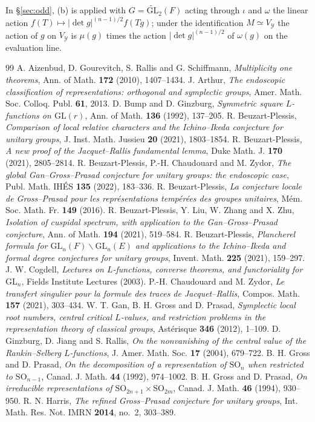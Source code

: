 \documentclass[11pt,oneside,notitlepage]{book}
\numberwithin{equation}{section}
\theoremstyle{plain}
\theoremstyle{definition}
\newcommand{\GL}{\mathrm{GL}}
\newcommand{\SO}{\mathrm{SO}}
\newcommand{\tGL}{\widetilde{\GL}}
\begin{document}
In \S\ref{sec:odd}, (b) is applied with $G=\tGL_2(F)$ acting through $\iota$ and $\omega$ the linear action $f(T)\mapsto|\det g|^{(n-1)/2}f(Tg)$; under the identification $M\simeq V_{\mathcal Y}$ the action of $g$ on $V_{\mathcal Y}$ is $\mu(g)$ times the action $|\det g|^{(n-1)/2}$ of $\omega(g)$ on the evaluation line.


\backmatter
\begin{thebibliography}{99}
	 A. Aizenbud, D. Gourevitch, S. Rallis and G. Schiffmann, \emph{Multiplicity one theorems}, Ann. of Math. \textbf{172} (2010), 1407--1434.
	 J. Arthur, \emph{The endoscopic classification of representations: orthogonal and symplectic groups}, Amer. Math. Soc. Colloq. Publ. \textbf{61}, 2013.
	 D. Bump and D. Ginzburg, \emph{Symmetric square $L$-functions on $\GL(r)$}, Ann. of Math. \textbf{136} (1992), 137--205.
	 R. Beuzart-Plessis, \emph{Comparison of local relative characters and the Ichino--Ikeda conjecture for unitary groups}, J. Inst. Math. Jussieu \textbf{20} (2021), 1803--1854.
	 R. Beuzart-Plessis, \emph{A new proof of the Jacquet--Rallis fundamental lemma}, Duke Math. J. \textbf{170} (2021), 2805--2814.
	 R. Beuzart-Plessis, P.-H. Chaudouard and M. Zydor, \emph{The global Gan--Gross--Prasad conjecture for unitary groups: the endoscopic case}, Publ. Math. IH\'ES \textbf{135} (2022), 183--336.
	 R. Beuzart-Plessis, \emph{La conjecture locale de Gross--Prasad pour les repr\'esentations temp\'er\'ees des groupes unitaires}, M\'em. Soc. Math. Fr. \textbf{149} (2016).
	 R. Beuzart-Plessis, Y. Liu, W. Zhang and X. Zhu, \emph{Isolation of cuspidal spectrum, with application to the Gan--Gross--Prasad conjecture}, Ann. of Math. \textbf{194} (2021), 519--584.
	 R. Beuzart-Plessis, \emph{Plancherel formula for $\GL_n(F)\backslash\GL_n(E)$ and applications to the Ichino--Ikeda and formal degree conjectures for unitary groups}, Invent. Math. \textbf{225} (2021), 159--297.
	 J. W. Cogdell, \emph{Lectures on $L$-functions, converse theorems, and functoriality for $\GL_n$}, Fields Institute Lectures (2003).
	 P.-H. Chaudouard and M. Zydor, \emph{Le transfert singulier pour la formule des traces de Jacquet--Rallis}, Compos. Math. \textbf{157} (2021), 303--434.
	 W. T. Gan, B. H. Gross and D. Prasad, \emph{Symplectic local root numbers, central critical $L$-values, and restriction problems in the representation theory of classical groups}, Ast\'erisque \textbf{346} (2012), 1--109.
	 D. Ginzburg, D. Jiang and S. Rallis, \emph{On the nonvanishing of the central value of the Rankin--Selberg $L$-functions}, J. Amer. Math. Soc. \textbf{17} (2004), 679--722.
	 B. H. Gross and D. Prasad, \emph{On the decomposition of a representation of $\SO_n$ when restricted to $\SO_{n-1}$}, Canad. J. Math. \textbf{44} (1992), 974--1002.
	 B. H. Gross and D. Prasad, \emph{On irreducible representations of $\SO_{2n+1}\times\SO_{2m}$}, Canad. J. Math. \textbf{46} (1994), 930--950.
	 R. N. Harris, \emph{The refined Gross--Prasad conjecture for unitary groups}, Int. Math. Res. Not. IMRN \textbf{2014}, no.~2, 303--389.
	

\end{thebibliography}
\end{document}
